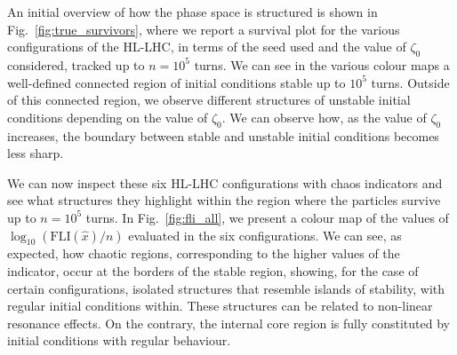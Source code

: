 An initial overview of how the phase space is structured is shown in Fig.~\ref{fig:true_survivors}, where we report a survival plot for the various configurations of the HL-LHC, in terms of the seed used and the value of $\zeta_0$ considered, tracked up to $n=10^5$ turns. We can see in the various colour maps a well-defined connected region of initial conditions stable up to $10^5$ turns. Outside of this connected region, we observe different structures of unstable initial conditions depending on the value of $\zeta_0$. We can observe how, as the value of $\zeta_0$ increases, the boundary between stable and unstable initial conditions becomes less sharp.

We can now inspect these six HL-LHC configurations with chaos indicators and see what structures they highlight within the region where the particles survive up to $n=10^5$ turns. In Fig.~\ref{fig:fli_all}, we present a colour map of the values of $\log_{10}(\mathrm{FLI}(\hat{x})/n)$ evaluated in the six configurations. We can see, as expected, how chaotic regions, corresponding to the higher values of the indicator, occur at the borders of the stable region, showing, for the case of certain configurations, isolated structures that resemble islands of stability, with regular initial conditions within. These structures can be related to non-linear resonance effects. On the contrary, the internal core region is fully constituted by initial conditions with regular behaviour.

